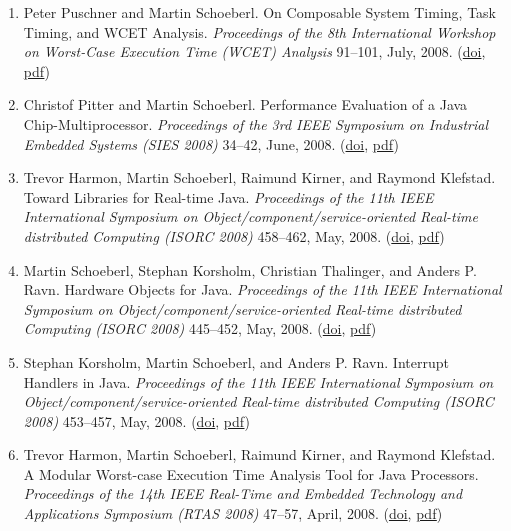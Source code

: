 \begin{enumerate}
\item Peter Puschner and Martin Schoeberl.
 On Composable System Timing, Task Timing, and WCET Analysis.
 \emph{Proceedings of the 8th International Workshop on Worst-Case Execution Time (WCET) Analysis} 91--101, July, 2008.
(\href{http://dx.doi.org/10.4230/LIPIcs.STACS.2008.1378}{doi}, \href{http://www.jopdesign.com/doc/wcet2008.pdf}{pdf})

\item Christof Pitter and Martin Schoeberl.
 Performance Evaluation of a Java Chip-Multiprocessor.
 \emph{Proceedings of the 3rd IEEE Symposium on Industrial Embedded Systems (SIES 2008)} 34--42, June, 2008.
(\href{http://dx.doi.org/10.1109/SIES.2008.4577678}{doi}, \href{http://www.jopdesign.com/doc/cmpeval_sies2008.pdf}{pdf})

\item Trevor Harmon, Martin Schoeberl, Raimund Kirner, and Raymond Klefstad.
 Toward Libraries for Real-time Java.
 \emph{Proceedings of the 11th IEEE International Symposium on Object/component/service-oriented Real-time distributed Computing (ISORC 2008)} 458--462, May, 2008.
(\href{http://dx.doi.org/10.1109/ISORC.2008.73}{doi}, \href{http://www.jopdesign.com/doc/rtlib_isorc2008.pdf}{pdf})

\item Martin Schoeberl, Stephan Korsholm, Christian Thalinger, and Anders P. Ravn.
 Hardware Objects for Java.
 \emph{Proceedings of the 11th IEEE International Symposium on Object/component/service-oriented Real-time distributed Computing (ISORC 2008)} 445--452, May, 2008.
(\href{http://dx.doi.org/10.1109/ISORC.2008.63}{doi}, \href{http://www.jopdesign.com/doc/hwobj.pdf}{pdf})

\item Stephan Korsholm, Martin Schoeberl, and Anders P. Ravn.
 Interrupt Handlers in Java.
 \emph{Proceedings of the 11th IEEE International Symposium on Object/component/service-oriented Real-time distributed Computing (ISORC 2008)} 453--457, May, 2008.
(\href{http://dx.doi.org/10.1109/ISORC.2008.68}{doi}, \href{http://www.jopdesign.com/doc/ihjava_isorc2008.pdf}{pdf})

\item Trevor Harmon, Martin Schoeberl, Raimund Kirner, and Raymond Klefstad.
 A Modular Worst-case Execution Time Analysis Tool for Java Processors.
 \emph{Proceedings of the 14th IEEE Real-Time and Embedded Technology and Applications Symposium (RTAS 2008)} 47--57, April, 2008.
(\href{http://dx.doi.org/10.1109/RTAS.2008.34}{doi}, \href{http://www.jopdesign.com/doc/volta_rtas2008.pdf}{pdf})



\end{enumerate}
